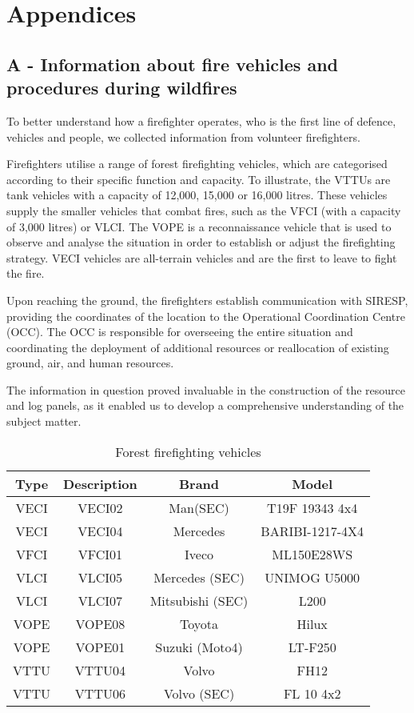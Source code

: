 \chapter{Appendices}

\section{A - Information about fire vehicles and procedures during wildfires}
To better understand how a firefighter operates, who is the 
first line of defence, vehicles and people, we collected 
information from volunteer firefighters. \par
Firefighters utilise a range of forest firefighting vehicles, 
which are categorised according to their specific function and 
capacity. To illustrate, the VTTUs are tank vehicles with a 
capacity of 12,000, 15,000 or 16,000 litres. These vehicles 
supply the smaller vehicles that combat fires, such as the 
VFCI (with a capacity of 3,000 litres) or VLCI. The VOPE is a 
reconnaissance vehicle that is used to observe and analyse 
the situation in order to establish or adjust the firefighting
strategy. VECI vehicles are all-terrain vehicles and are the 
first to leave to fight the fire. \par
Upon reaching the ground, the firefighters establish 
communication with SIRESP, providing the coordinates of the 
location to the Operational Coordination Centre (OCC). The OCC
is responsible for overseeing the entire situation and 
coordinating the deployment of additional resources or 
reallocation of existing ground, air, and human resources. \par
The information in question proved invaluable in the construction 
of the resource and log panels, as it enabled us to develop a 
comprehensive understanding of the subject matter. \\ 
\begin{table}[H]
    \centering 
\caption{Forest firefighting vehicles} 
\begin{tabular}{ |c|c|c|c| } 
\hline
\textbf{Type} & \textbf{Description} & \textbf{Brand} & \textbf{Model} \\ 
\hline
VECI & VECI02 & Man(SEC) & T19F 19343 4x4 \\
\hline 
VECI & VECI04 & Mercedes & BARIBI-1217-4X4 \\ 
\hline
VFCI & VFCI01 & Iveco & ML150E28WS \\ 
\hline 
VLCI & VLCI05 & Mercedes (SEC) & UNIMOG U5000 \\ 
\hline 
VLCI & VLCI07 & Mitsubishi (SEC) & L200 \\ 
\hline 
VOPE & VOPE08 & Toyota & Hilux \\ 
\hline 
VOPE & VOPE01 & Suzuki (Moto4) & LT-F250 \\ 
\hline 
VTTU & VTTU04 & Volvo & FH12 \\
\hline 
VTTU & VTTU06 & Volvo (SEC) & FL 10 4x2 \\ 
\hline
\end{tabular}
\end{table}
